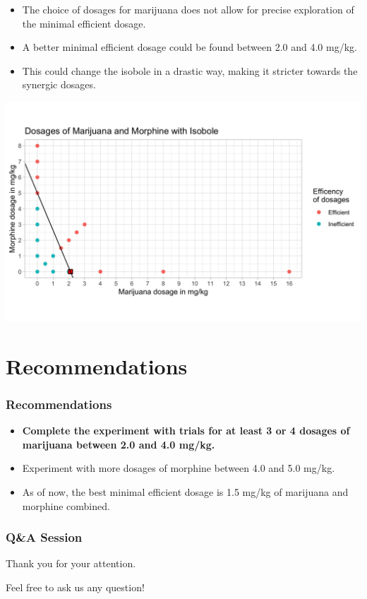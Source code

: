 \documentclass[14pt]{beamer}
\begin{document}
\begin{frame}
\begin{itemize}[label={$\blacktriangleright$}]
\item The choice of dosages for marijuana does not allow for precise exploration of the minimal efficient dosage.
\item A better minimal efficient dosage could be found between 2.0 and 4.0 mg/kg.
\item This could change the isobole in a drastic way, making it stricter towards the synergic dosages.
\end{itemize}
\end{frame}

\begin{frame}
\includegraphics[scale=0.23]{mari_fake.png}
\end{frame}

\section{Recommendations}

\begin{frame}
\frametitle{Recommendations}
\begin{itemize}[label={\checkmark}]
\item \textbf{Complete the experiment with trials for at least 3 or 4 dosages of marijuana between 2.0 and 4.0 mg/kg.}
\item Experiment with more dosages of morphine between 4.0 and 5.0 mg/kg.
\item As of now, the best minimal efficient dosage is 1.5 mg/kg of marijuana and morphine combined.
\end{itemize}
\end{frame}

\begin{frame}
\frametitle{Q\&A Session}
Thank you for your attention. 

\bigskip

Feel free to ask us any question!
\end{frame}
\end{document}

